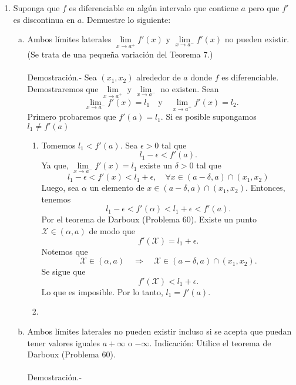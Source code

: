 \begin{enumerate}[\bfseries 1.]
\begin{enumerate}[(a)]
	\end{enumerate}

    \item Suponga que $f$ es diferenciable en algún intervalo que contiene $a$ pero que $f'$ es discontinua en $a$. Demuestre lo siguiente:

	\begin{enumerate}[(a)]

	    \item Ambos límites laterales $\lim\limits_{x\to a^+}f'(x)$ y $\lim\limits_{x\to a^-} f'(x)$ no pueden existir. (Se trata de una pequeña variación del Teorema 7.)\\\\
		Demostración.-\; Sea $(x_1,x_2)$ alrededor de $a$ donde $f$ es diferenciable. Demostraremos que $\lim\limits_{x\to a^+}$ y $\lim\limits_{x\to a^-}$ no existen. Sean
		$$\lim_{x\to a^-}f'(x)=l_1\quad \mbox{y}\quad \lim_{x\to a^+}f'(x)=l_2.$$
		Primero probaremos que $f'(a)=l_1$. Si es posible supongamos $l_1\neq f'(a)$

		\begin{enumerate}
		    \item Tomemos $l_1<f'(a)$. Sea $\epsilon>0$ tal que
		    $$l_1-\epsilon<f'(a).$$
		    Ya que, $\lim\limits_{x\to a^-}f'(x)=l_1$ existe un $\delta>0$ tal que
		    $$l_1-\epsilon<f'(x)<l_1+\epsilon,\quad \forall x\in (a-\delta,a)\cap(x_1,x_2)$$
		    Luego, sea $\alpha$ un elemento de $x\in (a-\delta,a)\cap(x_1,x_2)$. Entonces, tenemos
		    $$l_1-\epsilon<f'(\alpha)<l_1+\epsilon<f'(a).$$
		    Por el teorema de Darboux (Problema 60). Existe un punto $\mathcal{X}\in (\alpha,a)$ de modo que
		    $$f'\left(\mathcal{X}\right)=l_1+\epsilon.$$
		    Notemos que
		    $$\mathcal{X}\in \left(\alpha,a\right)\quad\Rightarrow \quad \mathcal{X}\in (a-\delta,a)\cap (x_1,x_2).$$
		    Se sigue que
		    $$f'\left(\mathcal{X}\right)<l_1+\epsilon.$$
		    Lo que es imposible. Por lo tanto, $l_1=f'(a)$.\\

		    \item 

		\end{enumerate}


	    \item Ambos límites laterales no pueden existir incluso si se acepta que puedan tener valores iguales $a+\infty$ o $-\infty$. Indicación: Utilice el teorema de Darboux (Problema 60).\\\\
		Demostración.-\;

	\end{enumerate}


	
\end{enumerate}

